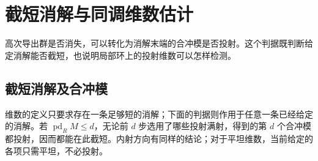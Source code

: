 
\section{截短消解与同调维数估计}
\label{b4:sec:1002}

高次导出群是否消失，可以转化为消解末端的合冲模是否投射。这个判据既判断给定消解能否截短，也说明局部环上的投射维数可以怎样检测。

%
%

\subsection{截短消解及合冲模}
\label{b4:subsec:1002:01}

维数的定义只要求存在一条足够短的消解；下面的判据则作用于任意一条已经给定的消解。若 \(\operatorname{pd}_RM\le d\)，无论前 \(d\) 步选用了哪些投射满射，得到的第 \(d\) 个合冲模都投射，因而都能在此截短。内射方向有同样的结论；对于平坦维数，当前给定的各项只需平坦，不必投射。

